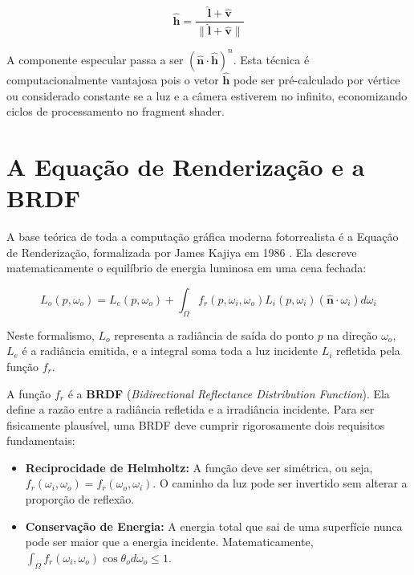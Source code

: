 \begin{equation}
    \hat{\mathbf{h}} = \frac{\hat{\mathbf{l}} + \hat{\mathbf{v}}}{\|\hat{\mathbf{l}} + \hat{\mathbf{v}}\|}
\end{equation}

A componente especular passa a ser $(\hat{\mathbf{n}} \cdot \hat{\mathbf{h}})^n$. Esta técnica é computacionalmente vantajosa pois o vetor $\hat{\mathbf{h}}$ pode ser pré-calculado por vértice ou considerado constante se a luz e a câmera estiverem no infinito, economizando ciclos de processamento no fragment shader.

\section{A Equação de Renderização e a BRDF}

A base teórica de toda a computação gráfica moderna fotorrealista é a Equação de Renderização, formalizada por James Kajiya em 1986 \cite{kajiya1986rendering}. Ela descreve matematicamente o equilíbrio de energia luminosa em uma cena fechada:

\begin{equation}
    L_o(p, \omega_o) = L_e(p, \omega_o) + \int_{\Omega} f_r(p, \omega_i, \omega_o) L_i(p, \omega_i) (\hat{\mathbf{n}} \cdot \omega_i) d\omega_i
\end{equation}

Neste formalismo, $L_o$ representa a radiância de saída do ponto $p$ na direção $\omega_o$, $L_e$ é a radiância emitida, e a integral soma toda a luz incidente $L_i$ refletida pela função $f_r$.

A função $f_r$ é a \textbf{BRDF} (\textit{Bidirectional Reflectance Distribution Function}). Ela define a razão entre a radiância refletida e a irradiância incidente. Para ser fisicamente plausível, uma BRDF deve cumprir rigorosamente dois requisitos fundamentais:
\begin{itemize}
    \item \textbf{Reciprocidade de Helmholtz:} A função deve ser simétrica, ou seja, $f_r(\omega_i, \omega_o) = f_r(\omega_o, \omega_i)$. O caminho da luz pode ser invertido sem alterar a proporção de reflexão.
    \item \textbf{Conservação de Energia:} A energia total que sai de uma superfície nunca pode ser maior que a energia incidente. Matematicamente, $\int_{\Omega} f_r(\omega_i, \omega_o) \cos\theta_o d\omega_o \le 1$.
\end{itemize}

